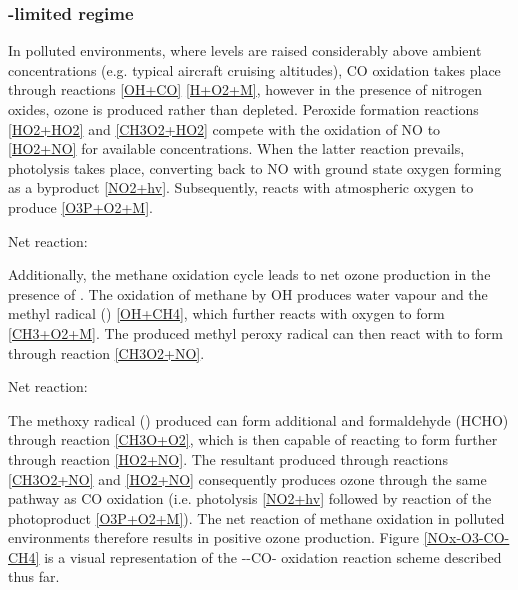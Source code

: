 

\subsubsection{-limited regime}
In polluted environments, where  levels are raised considerably above ambient concentrations (e.g. typical aircraft cruising altitudes), CO oxidation takes place through reactions \eqref{OH+CO} \eqref{H+O2+M}, however in the presence of nitrogen oxides, ozone is produced rather than depleted. Peroxide formation reactions \eqref{HO2+HO2} and \eqref{CH3O2+HO2} compete with the oxidation of NO to  \eqref{HO2+NO} for available  concentrations. When the latter reaction prevails,  photolysis takes place, converting back to NO with ground state oxygen  forming as a byproduct \eqref{NO2+hv}. Subsequently,  reacts with atmospheric oxygen to produce  \eqref{O3P+O2+M}.




Net reaction: 

Additionally, the methane oxidation cycle leads to net ozone production in the presence of . The oxidation of methane by OH produces water vapour and the methyl radical () \eqref{OH+CH4}, which further reacts with oxygen to form  \eqref{CH3+O2+M}. The produced methyl peroxy radical can then react with  to form  through reaction \eqref{CH3O2+NO}.





Net reaction: 

The methoxy radical () produced can form additional  and formaldehyde (HCHO) through reaction \eqref{CH3O+O2}, which is then capable of reacting to form further  through reaction \eqref{HO2+NO}. The resultant  produced through reactions \eqref{CH3O2+NO} and \eqref{HO2+NO} consequently produces ozone through the same pathway as CO oxidation (i.e.  photolysis \eqref{NO2+hv} followed by reaction of the  photoproduct \eqref{O3P+O2+M}). The net reaction of methane oxidation in polluted environments therefore results in positive ozone production. Figure \ref{NOx-O3-CO-CH4} is a visual representation of the --CO- oxidation reaction scheme described thus far.

